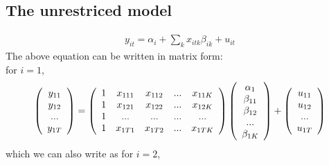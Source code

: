 \documentclass[a4paper]{article}
\begin{document}
\subsection{The unrestriced model}
\begin{align*}
y_{it}=\alpha_i + \sum_k x_{itk}\beta_{ik} + u_{it}
\end{align*}
The above equation can be written in matrix form:\\
for $i = 1$,
\begin{align*}
 \left( \begin{array} { c  } 
                   y_{11}  \\
                   y_{12}  \\
                   ... \\
                   y_{1T} \\
           \end{array} \right)
       = \left( \begin{array} { c c c c c } 
                 1 &  x_{111} & x_{112} & ... & x_{11K} \\
                 1 &  x_{121} & x_{122} & ... & x_{12K}\\
                 1 &  ... & ... & ...&...\\
                 1 &  x_{1T1} & x_{1T2} & ... &x_{1TK}\\
           \end{array} \right)
            \left( \begin{array} { c } 
                   \alpha_1 \\
                   \beta_{11}  \\
                   \beta_{12}  \\
                   ... \\
                   \beta_{1K} \\
           \end{array} \right)
               +
            \left( \begin{array} { c  } 
                   u_{11}  \\
                   u_{12}  \\
                   ... \\
                   u_{1T} \\
           \end{array} \right)
\end{align*}
which we can also write as
for $i = 2$,
\end{document}
